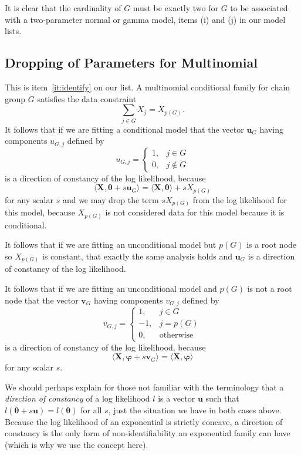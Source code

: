 \documentclass[11pt]{article}
\newcommand{\inner}[1]{\langle #1 \rangle}
\newcommand{\boldtheta}{\boldsymbol{\theta}}
\newcommand{\boldvarphi}{\boldsymbol{\varphi}}
\newcommand{\boldX}{\mathbf{X}}
\newcommand{\boldu}{\mathbf{u}}
\newcommand{\boldv}{\mathbf{v}}
\begin{document}
It is clear that the cardinality of $G$ must be exactly two for $G$
to be associated with a two-parameter normal or gamma model, items
(i) and (j) in our model lists.

\subsection{Dropping of Parameters for Multinomial}

This is item~\ref{it:identify} on our list.
A multinomial conditional family for chain group $G$ satisfies the data
constraint
\begin{equation} \label{eq:constraint}
   \sum_{j \in G} X_j = X_{p(G)}.
\end{equation}
It follows that if we are fitting a conditional model that
the vector $\boldu_G$ having components $u_{G, j}$ defined by
$$
   u_{G, j} = \begin{cases} 1, & j \in G \\ 0, & j \notin G \end{cases}
$$
is a direction of constancy of the log likelihood, because
$$
   \inner{ \boldX, \boldtheta + s \boldu_G }
   =
   \inner{ \boldX, \boldtheta } + s X_{p(G)}
$$
for any scalar $s$ and we may drop the term $s X_{p(G)}$ from the
log likelihood for this model, because $X_{p(G)}$ is not considered
data for this model because it is conditional.

It follows that if we are fitting an unconditional model
but $p(G)$ is a root node so $X_{p(G)}$ is constant, that exactly
the same analysis holds and $\boldu_G$ is a direction of constancy
of the log likelihood.

It follows that if we are fitting an unconditional model and $p(G)$
is not a root node that
the vector $\boldv_G$ having components $v_{G, j}$ defined by
$$
   v_{G, j} = \begin{cases} 1, & j \in G \\
   - 1, & j = p(G) \\ 0, & \text{otherwise} \end{cases}
$$
is a direction of constancy of the log likelihood, because
$$
   \inner{ \boldX, \boldvarphi + s \boldv_G }
   =
   \inner{ \boldX, \boldvarphi }
$$
for any scalar $s$.

We should perhaps explain for those not familiar with the terminology
that a \emph{direction of constancy} of a log likelihood $l$ is a vector
$\boldu$ such that $l(\boldtheta + s \boldu) = l(\boldtheta)$ for all
$s$, just the situation we have in both cases above.
Because the log likelihood of an exponential is strictly concave,
a direction of constancy is the only form of non-identifiability an
exponential family can have (which is why we use the concept here).
\end{document}
